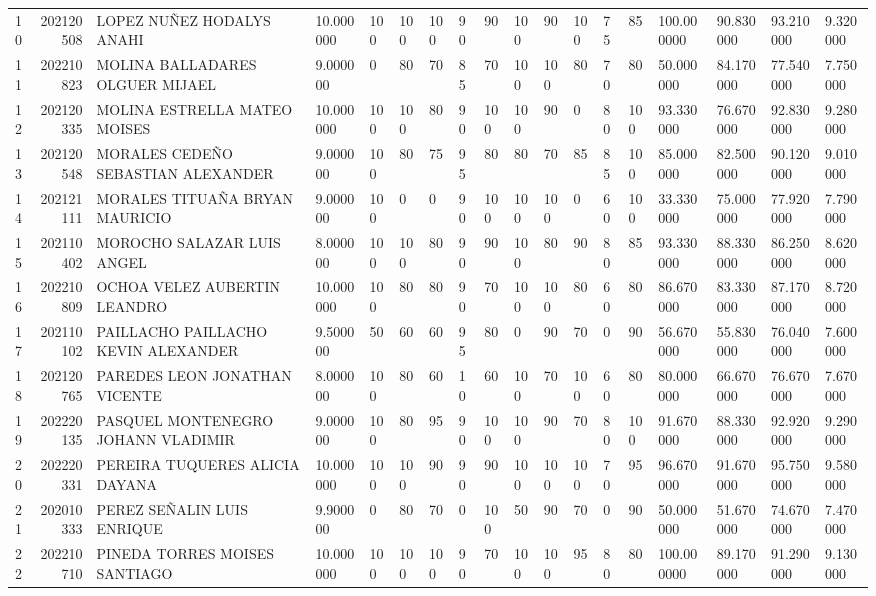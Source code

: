 \documentclass{article}
\begin{document}
\begin{table}
\begin{tabularx}{\textwidth}{lrp{}XXXXXXXXXXXXXXX}
10 & 202120508 & LOPEZ NUÑEZ HODALYS ANAHI & 10.000000 & 100 & 100 & 100 & 90 & 90 & 100 & 90 & 100 & 75 & 85 & 100.000000 & 90.830000 & 93.210000 & 9.320000 \\
11 & 202210823 & MOLINA BALLADARES OLGUER MIJAEL & 9.000000 & 0 & 80 & 70 & 85 & 70 & 100 & 100 & 80 & 70 & 80 & 50.000000 & 84.170000 & 77.540000 & 7.750000 \\
12 & 202120335 & MOLINA ESTRELLA MATEO MOISES & 10.000000 & 100 & 100 & 80 & 90 & 100 & 100 & 90 & 0 & 80 & 100 & 93.330000 & 76.670000 & 92.830000 & 9.280000 \\
13 & 202120548 & MORALES CEDEÑO SEBASTIAN ALEXANDER & 9.000000 & 100 & 80 & 75 & 95 & 80 & 80 & 70 & 85 & 85 & 100 & 85.000000 & 82.500000 & 90.120000 & 9.010000 \\
14 & 202121111 & MORALES TITUAÑA BRYAN MAURICIO & 9.000000 & 100 & 0 & 0 & 90 & 100 & 100 & 100 & 0 & 60 & 100 & 33.330000 & 75.000000 & 77.920000 & 7.790000 \\
15 & 202110402 & MOROCHO SALAZAR LUIS ANGEL & 8.000000 & 100 & 100 & 80 & 90 & 90 & 100 & 80 & 90 & 80 & 85 & 93.330000 & 88.330000 & 86.250000 & 8.620000 \\
16 & 202210809 & OCHOA VELEZ AUBERTIN LEANDRO & 10.000000 & 100 & 80 & 80 & 90 & 70 & 100 & 100 & 80 & 60 & 80 & 86.670000 & 83.330000 & 87.170000 & 8.720000 \\
17 & 202110102 & PAILLACHO PAILLACHO KEVIN ALEXANDER & 9.500000 & 50 & 60 & 60 & 95 & 80 & 0 & 90 & 70 & 0 & 90 & 56.670000 & 55.830000 & 76.040000 & 7.600000 \\
18 & 202120765 & PAREDES LEON JONATHAN VICENTE & 8.000000 & 100 & 80 & 60 & 10 & 60 & 100 & 70 & 100 & 60 & 80 & 80.000000 & 66.670000 & 76.670000 & 7.670000 \\
19 & 202220135 & PASQUEL MONTENEGRO JOHANN VLADIMIR & 9.000000 & 100 & 80 & 95 & 90 & 100 & 100 & 90 & 70 & 80 & 100 & 91.670000 & 88.330000 & 92.920000 & 9.290000 \\
20 & 202220331 & PEREIRA TUQUERES ALICIA DAYANA & 10.000000 & 100 & 100 & 90 & 90 & 90 & 100 & 100 & 100 & 70 & 95 & 96.670000 & 91.670000 & 95.750000 & 9.580000 \\
21 & 202010333 & PEREZ SEÑALIN LUIS ENRIQUE & 9.900000 & 0 & 80 & 70 & 0 & 100 & 50 & 90 & 70 & 0 & 90 & 50.000000 & 51.670000 & 74.670000 & 7.470000 \\
22 & 202210710 & PINEDA TORRES MOISES SANTIAGO & 10.000000 & 100 & 100 & 100 & 90 & 70 & 100 & 100 & 95 & 80 & 80 & 100.000000 & 89.170000 & 91.290000 & 9.130000 \\

\end{tabularx}
\end{table}
\end{document}
